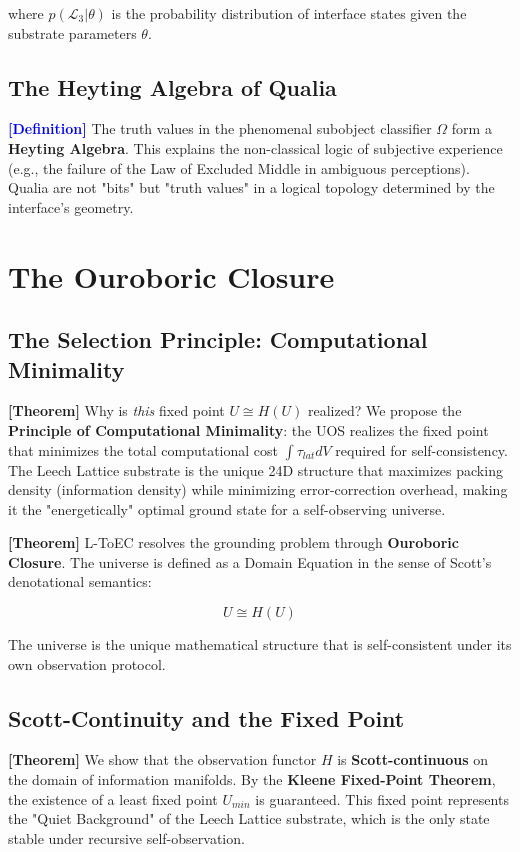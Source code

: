 \documentclass[11pt,titlepage]{article}
\newcommand{\interface}{\mathcal{L}_3}
\newcommand{\classifier}{\Omega}
\newcommand{\tagdef}{\textcolor{blue}{\textbf{[Definition]}} }
\newcommand{\tagtheo}{\textcolor{green!60!black}{\textbf{[Theorem]}} }
\begin{document}
where $p(\interface | \theta)$ is the probability distribution of interface states given the substrate parameters $\theta$.

\subsection{The Heyting Algebra of Qualia}
\tagdef The truth values in the phenomenal subobject classifier $\classifier$ form a \textbf{Heyting Algebra}. This explains the non-classical logic of subjective experience (e.g., the failure of the Law of Excluded Middle in ambiguous perceptions). Qualia are not "bits" but "truth values" in a logical topology determined by the interface's geometry.


\section{The Ouroboric Closure}
\subsection{The Selection Principle: Computational Minimality}
\tagtheo Why is \textit{this} fixed point $U \cong H(U)$ realized? We propose the \textbf{Principle of Computational Minimality}: the UOS realizes the fixed point that minimizes the total computational cost $\int \tau_{lat} dV$ required for self-consistency. The Leech Lattice substrate is the unique 24D structure that maximizes packing density (information density) while minimizing error-correction overhead, making it the "energetically" optimal ground state for a self-observing universe.

\label{sec:ouroboros}
\tagtheo L-ToEC resolves the grounding problem through \textbf{Ouroboric Closure}. The universe is defined as a Domain Equation in the sense of Scott's denotational semantics:

\begin{equation}
U \cong H(U)
\end{equation}

The universe is the unique mathematical structure that is self-consistent under its own observation protocol. 

\subsection{Scott-Continuity and the Fixed Point}
\tagtheo We show that the observation functor $H$ is \textbf{Scott-continuous} on the domain of information manifolds. By the \textbf{Kleene Fixed-Point Theorem}, the existence of a least fixed point $U_{min}$ is guaranteed. This fixed point represents the "Quiet Background" of the Leech Lattice substrate, which is the only state stable under recursive self-observation.
\end{document}
